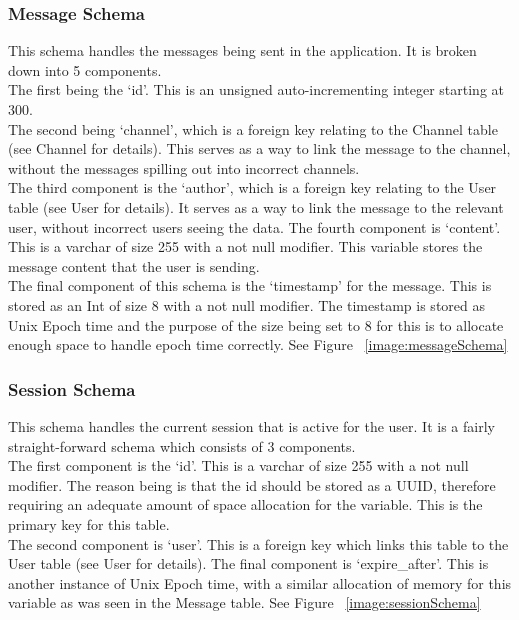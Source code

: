 \subsubsection{Message Schema}
This schema handles the messages being sent in the application. It is broken down into 5 components.
\\The first being the ‘id’. This is an unsigned auto-incrementing integer starting at 300.
\\The second being ‘channel’, which is a foreign key relating to the Channel table (see Channel for details). This serves as a way to link the message to the channel, without the messages spilling out into incorrect channels.
\\The third component is the ‘author’, which is a foreign key relating to the User table (see User for details). It serves as a way to link the message to the relevant user, without incorrect users seeing the data.
The fourth component is ‘content’. This is a varchar of size 255 with a not null modifier. This variable stores the message content that the user is sending.
\\The final component of this schema is the ‘timestamp’ for the message. This is stored as an Int of size 8 with a not null modifier.  The timestamp is stored as Unix Epoch time and the purpose of the size being set to 8 for this is to allocate enough space to handle epoch time correctly.
See Figure ~\ref{image:messageSchema}

\subsubsection{Session Schema}
This schema handles the current session that is active for the user. It is a fairly straight-forward schema which consists of 3 components.
\\ The first component is the ‘id’. This is a varchar of size 255 with a not null modifier. The reason being is that the id should be stored as a UUID, therefore requiring an adequate amount of space allocation for the variable. This is the primary key for this table.
\\ The second component is ‘user’. This is a foreign key which links this table to the User table (see User for details).
The final component is ‘expire\_after’. This is another instance of Unix Epoch time, with a similar allocation of memory for this variable as was seen in the Message table. 
See Figure ~\ref{image:sessionSchema}

